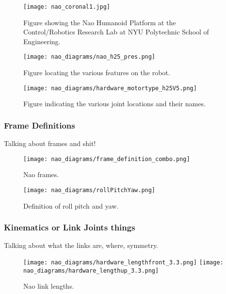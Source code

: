 \begin{figure}
\centering
\texttt{[image: nao\_coronal1.jpg]}
\caption{Figure showing the Nao Humanoid Platform at the Control/Robotics
         Research Lab at NYU Polytechnic School of Engineering.}
\label{fig:crrl_nao_coronal1}
\end{figure}

\begin{figure}
\centering
\texttt{[image: nao\_diagrams/nao\_h25\_pres.png]}
\caption{Figure locating the various features on the robot.}
\label{fig:nao_features1}
\end{figure}

\begin{figure}
\centering
\texttt{[image: nao\_diagrams/hardware\_motortype\_h25V5.png]}
\caption{Figure indicating the various joint locations and their names.}
\label{fig:nao_joints1}
\end{figure}



\subsubsection{Frame Definitions}
Talking about frames and shit!

\begin{figure}
\centering
\texttt{[image: nao\_diagrams/frame\_definition\_combo.png]}
\caption{Nao frames.}
\label{fig:nao_frames1}
\end{figure}

\begin{figure}
\centerline{\texttt{[image: nao\_diagrams/rollPitchYaw.png]}
}
\caption{Definition of roll pitch and yaw.}
\label{fig:nao_rpy_def1}
\end{figure}

\subsubsection{Kinematics or Link Joints things}
Talking about what the links are, where, symmetry.

\begin{figure}
\centerline{\texttt{[image: nao\_diagrams/hardware\_lengthfront\_3.3.png]}
            \texttt{[image: nao\_diagrams/hardware\_lengthup\_3.3.png]}
}
\caption{Nao link lengths.}
\label{fig:nao_link_lengths1}
\end{figure}

